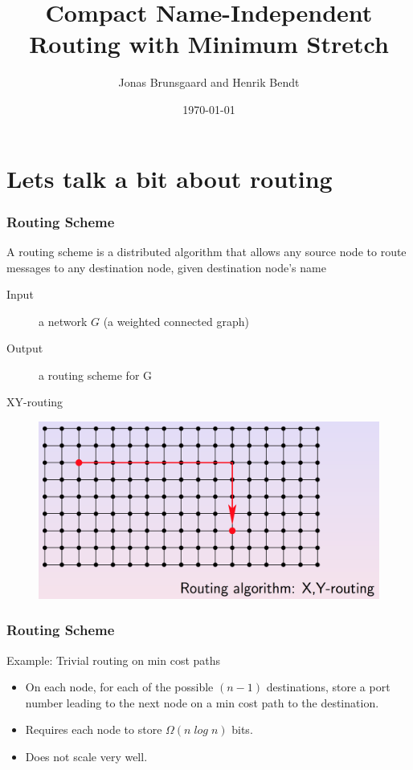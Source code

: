 \documentclass[10pt, compress]{beamer}
\title{Compact Name-Independent Routing with Minimum Stretch}
\subtitle{}
\date{\today}
\author{Jonas Brunsgaard and Henrik Bendt}
\institute{DIKU}
\begin{document}
\maketitle

\section{Lets talk a bit about routing}
\begin{frame}[fragile]
  \frametitle{Routing Scheme}
    A routing scheme is a distributed algorithm that allows any
    source node to route messages to any destination node, given
    destination node's name

    \begin{description}
        \item[Input] a network $G$ (a weighted connected graph)
        \item[Output] a routing scheme for G
    \end{description}
\end{frame}

\begin{frame}{XY-routing}
  \begin{figure}
    \includegraphics[scale=0.3]{images/xyrouting.png} 
  \end{figure}
\end{frame}

\begin{frame}[fragile]
  \frametitle{Routing Scheme}
     
  \begin{block}{Example: Trivial routing on min cost paths}
      \begin{itemize}
        \item On each node, for each of the possible $(n-1)$ destinations,
        store a port number leading to the next node on a min cost path to the
        destination.
        \item Requires each node to store $\Omega (n\; log\; n)$ bits.
        \item Does not scale very well.
      \end{itemize}
  \end{block}
\end{frame}
\end{document}

